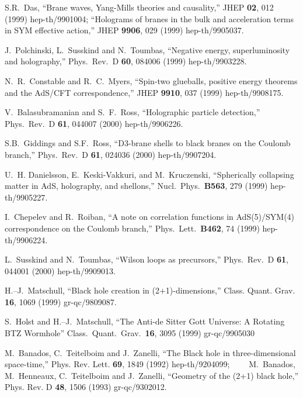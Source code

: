 \documentclass[a4paper,12pt]{article}
\begin{document}
\begin{thebibliography}{10}
S.R.~Das, 
``Brane waves, Yang-Mills theories and causality,'' 
JHEP {\bf 02}, 012 (1999) 
hep-th/9901004;
``Holograms of branes in the bulk and acceleration terms in SYM effective 
action,'' JHEP {\bf 9906}, 029 (1999)
hep-th/9905037. 
 
J.~Polchinski, L.~Susskind and N.~Toumbas,
``Negative energy, superluminosity and holography,''
Phys.\ Rev.\  D {\bf 60}, 084006 (1999)
hep-th/9903228.

N.~R.~Constable and R.~C.~Myers,
``Spin-two glueballs, positive energy 
theorems and the AdS/CFT  correspondence,''
JHEP {\bf 9910}, 037 (1999)
hep-th/9908175.

V.~Balasubramanian and S.~F.~Ross,
``Holographic particle detection,''
Phys.\ Rev.\  D {\bf 61}, 044007 (2000)
hep-th/9906226.

S.B.~Giddings and S.F.~Ross,
``D3-brane shells to black branes on the Coulomb branch,''
Phys.\ Rev.\  D {\bf 61}, 024036 (2000)
hep-th/9907204.

U.~H. Danielsson, E.~Keski-Vakkuri, and M.~Kruczenski, 
``Spherically
collapsing  matter in AdS, holography, and shellons,''
Nucl.\ Phys.\  {\bf B563}, 279 (1999)
hep-th/9905227.

I.~Chepelev and R.~Roiban, 
``A note on correlation functions in AdS(5)/SYM(4)
  correspondence on the Coulomb branch,''
Phys.\ Lett.\  {\bf B462}, 74 (1999)
hep-th/9906224.

L.~Susskind and N.~Toumbas,
``Wilson loops as precursors,''
Phys.\ Rev.\  D {\bf 61}, 044001 (2000)
hep-th/9909013.

H.--J.~Matschull, 
``Black hole creation in (2+1)-dimensions,''
Class. Quant. Grav. {\bf 16}, 1069 (1999)
gr-qc/9809087. 

S.~Holst 
and 
H.--J.~Matschull, 
``The Anti-de Sitter Gott Universe: A Rotating BTZ Wormhole'' 
Class.\ Quant.\ Grav.\  {\bf 16}, 3095 (1999)
gr-qc/9905030 

M.~Banados, C.~Teitelboim and J.~Zanelli, 
``The Black hole in three-dimensional space-time,'' 
Phys. Rev. Lett. {\bf 69}, 1849 (1992) 
hep-th/9204099;~~~~ 
M.~Banados, M.~Henneaux, C.~Teitelboim and J.~Zanelli, 
``Geometry of the (2+1) black hole,'' 
Phys. Rev. D {\bf 48}, 1506 (1993) 
gr-qc/9302012. 
 

\end{thebibliography}
\end{document}
